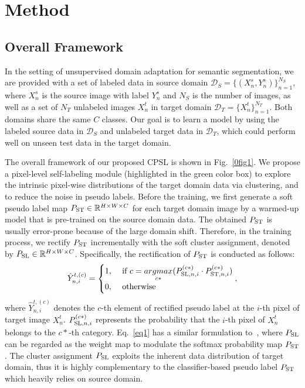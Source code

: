 \documentclass[10pt,twocolumn,letterpaper]{article}
\begin{document}
\section{Method}
	\subsection{Overall Framework}
	\label{sec3.1}
	In the setting of unsupervised domain adaptation for semantic segmentation, we are provided with a set of labeled data in source domain $\mathcal{D}_{S}=\{(X^s_n,Y^s_n)\}^{N_S}_{n=1}$, where $X^s_n$ is the source image with label $Y^s_n$ and $N_S$ is the number of images, as well as a set of $N_T$ unlabeled images $X^t_n$ in target domain $\mathcal{D}_{T}=\{X^t_n\}^{N_T}_{n=1}$. Both domains share the same $C$ classes. Our goal is to learn a model by using the labeled source data in $\mathcal{D}_{S}$ and unlabeled target data in $\mathcal{D}_{T}$, which could perform well on unseen test data in the target domain.
	
	The overall framework of our proposed CPSL is shown in Fig.~\ref{0fig1}. We propose a pixel-level self-labeling module (highlighted in the green color box) to explore the intrinsic pixel-wise distributions of the target domain data via clustering, and to reduce the noise in pseudo labels. Before the training, we first generate a soft pseudo label map $P_{\rm ST}\in \mathbb{R}^{H\times W\times C}$ for each target domain image by a warmed-up model that is pre-trained on the source domain data. The obtained $P_{\rm ST}$ is usually error-prone because of the large domain shift. Therefore, in the training process, we rectify $P_{\rm ST}$ incrementally with the soft cluster assignment, denoted by $P_{\rm SL}\in \mathbb{R}^{H\times W\times C}$. Specifically, the rectification of $P_{\rm ST}$ is conducted as follows:
{\small 	\begin{align}
			\label{eq1}
			\hat{Y}^{t,(c)}_{n,i} =\begin{cases}
				1, & \text{ if } c=\underset{c*}{argmax}(P^{(c*)} _{{\rm SL},n,i}\cdot P^{(c*)} _{{\rm ST},n,i}) \\ 
				0, & \text{ otherwise }  
			\end{cases},
	\end{align}}where $\hat{Y}_{n,i}^{t,(c)}$ denotes the $c$-th element of rectified pseudo label at the $i$-th pixel of target image $X^t_n$. $P^{(c*)} _{{\rm SL},n,i}$ represents the probability that the $i$-th pixel of $X^t_n$ belongs to the $c*$-th category. Eq.~\ref{eq1} has a similar formulation to~\cite{qi2018low,snell2017prototypical,zhang2021prototypical}, where $P_{{\rm SL}}$ can be regarded as the weight map to modulate the softmax probability map $P_{\rm ST}$. The cluster assignment $P_{\rm SL}$ exploits the inherent data distribution of target domain, thus it is highly complementary to the classifier-based pseudo label $P_{\rm ST}$ which heavily relies on source domain.
	
\end{document}
